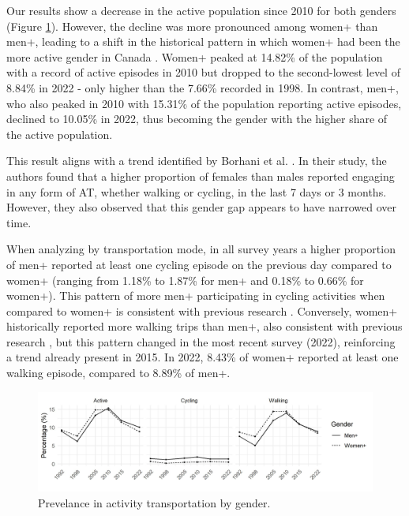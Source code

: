 \documentclass[preprint, 3p,
authoryear]{elsarticle} %
\begin{document}
Our results show a decrease in the active population since 2010 for both
genders (Figure \ref{fig:gender-perc-figure}). However, the decline was
more pronounced among women+ than men+, leading to a shift in the
historical pattern in which women+ had been the more active gender in
Canada \citep{bryan2009, borhani2024}. Women+ peaked at 14.82\% of the
population with a record of active episodes in 2010 but dropped to the
second-lowest level of 8.84\% in 2022 - only higher than the 7.66\%
recorded in 1998. In contrast, men+, who also peaked in 2010 with
15.31\% of the population reporting active episodes, declined to 10.05\%
in 2022, thus becoming the gender with the higher share of the active
population.

This result aligns with a trend identified by Borhani et al.
\citeyearpar{borhani2024}. In their study, the authors found that a
higher proportion of females than males reported engaging in any form of
AT, whether walking or cycling, in the last 7 days or 3 months. However,
they also observed that this gender gap appears to have narrowed over
time.

When analyzing by transportation mode, in all survey years a higher
proportion of men+ reported at least one cycling episode on the previous
day compared to women+ (ranging from 1.18\% to 1.87\% for men+ and
0.18\% to 0.66\% for women+). This pattern of more men+ participating in
cycling activities when compared to women+ is consistent with previous
research \citep{heesch2012, bryan2009, borhani2024}. Conversely, women+
historically reported more walking trips than men+, also consistent with
previous research \citep{goel2023, pollard2017, bryan2009, borhani2024},
but this pattern changed in the most recent survey (2022), reinforcing a
trend already present in 2015. In 2022, 8.43\% of women+ reported at
least one walking episode, compared to 8.89\% of men+.

\begin{figure}
\includegraphics[width=1\linewidth]{figures/active_pop_gender_graph} \caption{Prevelance in activity transportation by gender.}\label{fig:gender-perc-figure}
\end{figure}
\end{document}
